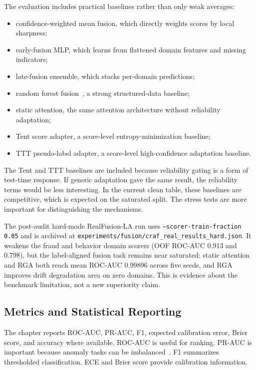 \documentclass[11pt]{article}
\begin{document}
The evaluation includes practical baselines rather than only weak averages:

\begin{itemize}
  \item confidence-weighted mean fusion, which directly weights scores by local
  sharpness;
  \item early-fusion MLP, which learns from flattened domain features and
  missing indicators;
  \item late-fusion ensemble, which stacks per-domain predictions;
  \item random forest fusion~\cite{breiman2001random}, a strong
  structured-data baseline;
  \item static attention, the same attention architecture without reliability
  adaptation;
  \item Tent score adapter, a score-level entropy-minimization baseline;
  \item TTT pseudo-label adapter, a score-level high-confidence adaptation
  baseline.
\end{itemize}

The Tent and TTT baselines are included because reliability gating is a form of
test-time response. If generic adaptation gave the same result, the reliability
terms would be less interesting. In the current clean table, these baselines are
competitive, which is expected on the saturated split. The stress tests are more
important for distinguishing the mechanisms.

The post-audit hard-mode RealFusion-LA run uses
\texttt{--scorer-train-fraction 0.05} and is archived at
\texttt{experiments/fusion/craf\_real\_results\_hard.json}. It weakens the
fraud and behavior domain scorers (OOF ROC-AUC 0.913 and 0.798), but the
label-aligned fusion task remains near saturated: static attention and RGA both
reach mean ROC-AUC 0.99896 across five seeds, and RGA improves drift degradation
area on zero domains. This is evidence about the benchmark limitation, not a
new superiority claim.

\subsection{Metrics and Statistical Reporting}

The chapter reports ROC-AUC, PR-AUC, F1, expected calibration error, Brier score,
and accuracy where available. ROC-AUC is useful for ranking. PR-AUC is important
because anomaly tasks can be imbalanced~\cite{davis2006relationship}. F1
summarizes thresholded classification. ECE and Brier score provide calibration
information.
\end{document}
